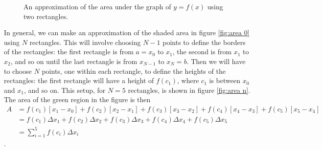 \documentclass{myarticle}
\theoremstyle{nospace}
\newtheorem{old series theorem}{Theorem}
\newenvironment{series theorem}{\begin{mdframed}\begin{old series theorem}}{\end{old series theorem}\end{mdframed}}
\begin{document}
\begin{figure}[htb!] \centering
{}
\caption{An approximation of the area under the graph of $y = f(x)$ using two rectangles.}
\label{fig:area 2}
\end{figure}

In general, we can make an approximation of the shaded area in figure \ref{fig:area 0} using $N$ rectangles. This will involve choosing $N - 1$ points to define the borders of the rectangles: the first rectangle is from $a = x_0$ to $x_1$, the second is from $x_1$ to $x_2$, and so on until the last rectangle is from $x_{N - 1}$ to $x_N = b$. Then we will have to choose $N$ points, one within each rectangle, to define the heights of the rectangles: the first rectangle will have a height of $f(c_1)$, where $c_1$ is between $x_0$ and $x_1$, and so on. This setup, for $N = 5$ rectangles, is shown in figure \ref{fig:area n}. The area of the green region in the figure is then \begin{align*} A &= f(c_1)[x_1 - x_0] + f(c_2)[x_2 - x_1] + f(c_3)[x_3 - x_2] + f(c_4)[x_4 - x_3] + f(c_5)[x_5 - x_4] \\ &= f(c_1)\Delta x_1 + f(c_2)\Delta x_2 + f(c_3)\Delta x_3 + f(c_4)\Delta x_4 + f(c_5)\Delta x_5 \\ &= \sum_{i=1}^5 f(c_i)\Delta x_i \end{align*}.
\end{document}
